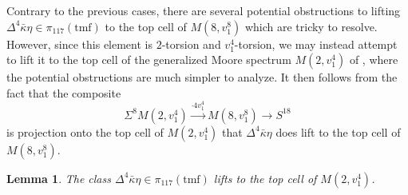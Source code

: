 \documentclass[10pt]{amsart}
\newcommand{\tmf}{\mathrm{tmf}}
\newtheorem{lem}[equation]{Lemma}
\theoremstyle{definition}
\numberwithin{equation}{section}
\numberwithin{figure}{section}
\begin{document}
Contrary to the previous cases, there are several potential obstructions to lifting $\Delta^4 \bar{\kappa}\eta \in \pi_{117}(\tmf)$ to the top cell of $M(8,v_1^8)$ which are tricky to resolve. 
However, since this element is $2$-torsion and $v_1^4$-torsion, we may instead attempt to lift it to the top cell of the generalized Moore spectrum $M(2,v_1^4)$ of \cite{BHHM}, where the potential obstructions are much simpler to analyze. It then follows from the fact that the composite
$$ \Sigma^{8}M(2,v_1^4) \xrightarrow{\cdot 4v_1^4} M(8,v_1^8) \rightarrow S^{18} $$
is projection onto the top cell of $M(2,v_1^4)$ that $\Delta^4\bar{\kappa}\eta$ does lift to the top cell of $M(8,v_1^8)$.  

\begin{lem}\label{Lem:v216kbe}
The class $\Delta^4 \bar{\kappa}\eta \in \pi_{117}(\tmf)$ lifts to the top cell of $M(2,v_1^4)$.
\end{lem}
\end{document}
